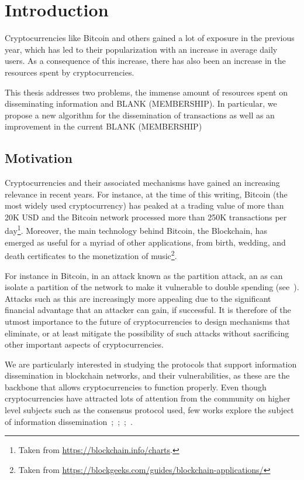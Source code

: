\chapter{Introduction}
\label{chap:intro}
Cryptocurrencies like Bitcoin and others gained a lot of exposure in the previous year, which has led to their popularization with an increase in average daily users. As a consequence of this increase, there has also been an increase in the resources spent by cryptocurrencies.

This thesis addresses two problems, the immense amount of resources spent on disseminating information and BLANK (MEMBERSHIP). In particular, we propose a new algorithm for the dissemination of transactions as well as an improvement in the current BLANK (MEMBERSHIP)
\section{Motivation}
\label{sec:motivation}

Cryptocurrencies and their associated mechanisms have gained an increasing relevance in recent years. For instance, at the time of this writing, Bitcoin (the most widely used cryptocurrency) has peaked at a trading value of more than 20K USD and the Bitcoin network processed more than 250K transactions per day\footnote{Taken from \url{https://blockchain.info/charts}.}. Moreover, the main technology behind Bitcoin, the Blockchain, has emerged as useful for a myriad of other applications, from birth, wedding, and death certificates to the monetization of music\footnote{Taken from \url{https://blockgeeks.com/guides/blockchain-applications/}}.

For instance in Bitcoin, in an attack known as the partition attack,  an \acrlong{as} can isolate a partition of the network to make it vulnerable to double spending (see~\cite{apostolaki2016hijacking}).
Attacks such as this are increasingly more appealing due to the significant financial advantage that an attacker can gain, if successful.
It is therefore of the utmost importance to the future of cryptocurrencies to design mechanisms that eliminate, or at least mitigate the possibility of such attacks without sacrificing other important aspects of cryptocurrencies.

We are particularly interested in studying the protocols that support information dissemination in blockchain networks, and their vulnerabilities, as these are the backbone that allows cryptocurrencies to function properly.
Even though cryptocurrencies have attracted lots of attention from the community on higher level subjects such as the consensus protocol used, few works explore the subject of information dissemination~\cite{miller2015discovering};~\cite{heilman2015eclipse};~\cite{bojja2017dandelion};~\cite{owenson2017proximity}.

